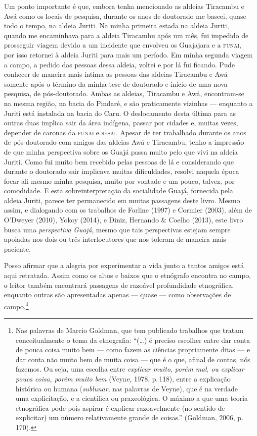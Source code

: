 Um ponto importante é que, embora tenha mencionado as aldeias
Tiracambu e Awá como os locais de pesquisa, durante os anos de doutorado
me baseei, quase todo o tempo, na aldeia Juriti. Na minha primeira
estada na aldeia Juriti, quando me encaminhava
para a aldeia Tiracambu após um mês, fui impedido de prosseguir viagem devido a um
incidente que envolveu os Guajajara e a \textsc{funai}, por isso retornei à
aldeia Juriti para mais um período. Em minha segunda viagem a campo, a
pedido das pessoas dessa aldeia, voltei e por lá fui ficando.
Pude conhecer de maneira mais íntima as pessoas das aldeias Tiracambu e Awá somente
após o término da minha tese de doutorado e início de uma nova pesquisa,
de pós-doutorado. Ambas as aldeias, Tiracambu e Awá, encontram-se na
mesma região, na bacia do Pindaré, e são praticamente vizinhas --- enquanto
a Juriti está instalada na bacia do Caru. O deslocamento desta última
para as outras duas implica sair da área indígena, passar por cidades e,
muitas vezes, depender de caronas da \textsc{funai} e \textsc{sesai}. Apesar de ter
trabalhado durante os anos de pós-doutorado com amigos das aldeias Awá
e Tiracambu, tenho a impressão de que minha perspectiva sobre os Guajá
passa muito pelo que vivi na aldeia Juriti. Como fui muito bem recebido
pelas pessoas de lá e considerando que durante o doutorado sair
implicava muitas dificuldades, resolvi naquela época focar ali mesmo
minha pesquisa, muito por vontade e um pouco, talvez, por comodidade. E
esta sobreinterpretação da socialidade Guajá, fornecida pela aldeia
Juriti, parece ter permanecido em muitas passagens deste livro. Mesmo
assim, e dialogando com os trabalhos de Forline (1997) e Cormier (2003),
além de O'Dweyer (2010), Yokoy (2014), e Diniz, Hernando \& Coelho
(2013), este livro busca uma \textit{perspectiva Guajá}, mesmo que tais
perspectivas estejam sempre apoiadas nos dois ou três interlocutores que
nos toleram de maneira mais paciente.

Posso afirmar que a alegria por experimentar a vida junto a tantos
amigos está aqui retratada. Assim como os altos e baixos que o etnógrafo
encontra no campo, o leitor também encontrará passagens de razoável
profundidade etnográfica, enquanto outras são apresentadas apenas ---
quase --- como observações de campo.\footnote{Nas palavras de Marcio
  Goldman, que tem publicado trabalhos que tratam conceitualmente o tema
  da etnografia: ``(\ldots{}) é preciso escolher entre dar conta de pouca
  coisa muito bem --- como fazem as ciências propriamente ditas --- e dar
  conta não muito bem de muita coisa --- que é o que, afinal de contas,
  nós fazemos. Ou seja, uma escolha entre \textit{explicar muito, porém mal,
  ou explicar pouca coisa, porém muito bem} (Veyne, 1978, p.\,118), entre a
  explicação histórica ou humana (\textit{sublunar}, nas palavras de Veyne),
  que é na verdade uma explicitação, e a científica ou praxeológica. O
  máximo a que uma teoria etnográfica pode pois aspirar é explicar
  razoavelmente (no sentido de explicitar) um número relativamente
  grande de coisas.'' (Goldman, 2006, p.\,170).} %

